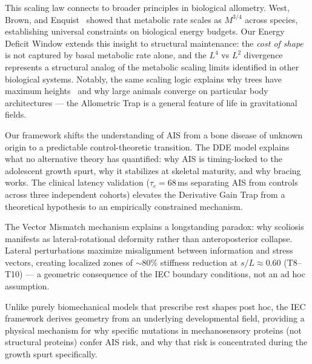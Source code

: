 \documentclass[11pt]{article}
\begin{document}
This scaling law connects to broader principles in biological allometry. West, Brown, and Enquist~\cite{west1997general} showed that metabolic rate scales as $M^{3/4}$ across species, establishing universal constraints on biological energy budgets. Our Energy Deficit Window extends this insight to structural maintenance: the \emph{cost of shape} is not captured by basal metabolic rate alone, and the $L^4$ vs $L^2$ divergence represents a structural analog of the metabolic scaling limits identified in other biological systems. Notably, the same scaling logic explains why trees have maximum heights~\cite{niklas1994plant} and why large animals converge on particular body architectures --- the Allometric Trap is a general feature of life in gravitational fields.

Our framework shifts the understanding of AIS from a bone disease of unknown origin to a predictable control-theoretic transition. The DDE model explains what no alternative theory has quantified: why AIS is timing-locked to the adolescent growth spurt, why it stabilizes at skeletal maturity, and why bracing works. The clinical latency validation ($\tau_c = 68$\,ms separating AIS from controls across three independent cohorts) elevates the Derivative Gain Trap from a theoretical hypothesis to an empirically constrained mechanism.

The Vector Mismatch mechanism explains a longstanding paradox: why scoliosis manifests as lateral-rotational deformity rather than anteroposterior collapse. Lateral perturbations maximize misalignment between information and stress vectors, creating localized zones of ${\sim}80\%$ stiffness reduction at $s/L \approx 0.60$ (T8--T10) --- a geometric consequence of the IEC boundary conditions, not an ad hoc assumption.

Unlike purely biomechanical models that prescribe rest shapes post hoc, the IEC framework derives geometry from an underlying developmental field, providing a physical mechanism for why specific mutations in mechanosensory proteins (not structural proteins) confer AIS risk, and why that risk is concentrated during the growth spurt specifically.
\end{document}
